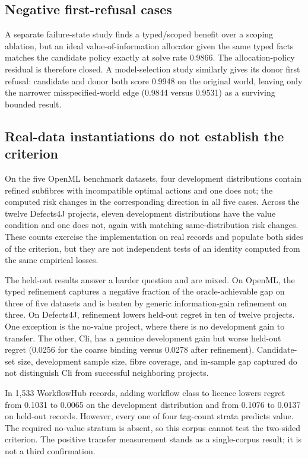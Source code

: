 

\subsection{Negative first-refusal cases}
A separate failure-state study finds a typed/scoped benefit over a scoping ablation, but an ideal value-of-information allocator given the same typed facts matches the candidate policy exactly at solve rate 0.9866. The allocation-policy residual is therefore closed. A model-selection study similarly gives its donor first refusal: candidate and donor both score 0.9948 on the original world, leaving only the narrower misspecified-world edge (0.9844 versus 0.9531) as a surviving bounded result.

\subsection{Real-data instantiations do not establish the criterion}
On the five OpenML benchmark datasets, four development distributions contain refined subfibres with incompatible optimal actions and one does not; the computed risk changes in the corresponding direction in all five cases. Across the twelve Defects4J projects, eleven development distributions have the value condition and one does not, again with matching same-distribution risk changes. These counts exercise the implementation on real records and populate both sides of the criterion, but they are not independent tests of an identity computed from the same empirical losses.

The held-out results answer a harder question and are mixed. On OpenML, the typed refinement captures a negative fraction of the oracle-achievable gap on three of five datasets and is beaten by generic information-gain refinement on three. On Defects4J, refinement lowers held-out regret in ten of twelve projects. One exception is the no-value project, where there is no development gain to transfer. The other, Cli, has a genuine development gain but worse held-out regret (0.0256 for the coarse binding versus 0.0278 after refinement). Candidate-set size, development sample size, fibre coverage, and in-sample gap captured do not distinguish Cli from successful neighboring projects.

In 1,533 WorkflowHub records, adding workflow class to licence lowers regret from 0.1031 to 0.0065 on the development distribution and from 0.1076 to 0.0137 on held-out records. However, every one of four tag-count strata predicts value. The required no-value stratum is absent, so this corpus cannot test the two-sided criterion. The positive transfer measurement stands as a single-corpus result; it is not a third confirmation.
